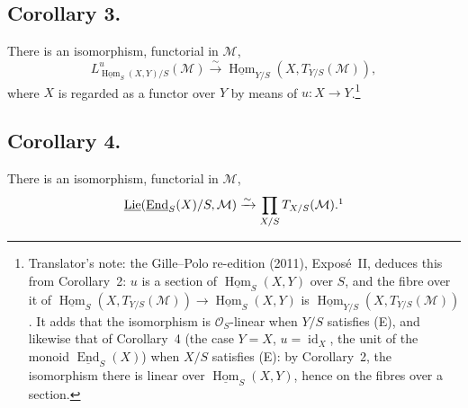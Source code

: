 \subsection*{Corollary 3.}
There is an isomorphism, functorial in \(\mathcal M\),
\[
  L^u_{\underline{\operatorname{Hom}}_S(X,Y)/S}(\mathcal M)
  \xrightarrow{\sim}
  \underline{\operatorname{Hom}}_{Y/S}(X,T_{Y/S}(\mathcal M)),
\]
where \(X\) is regarded as a functor over \(Y\) by means of
\(u:X\to Y\).\footnote{Translator's note: the Gille--Polo re-edition (2011),
Expos\'e~II, deduces this from Corollary~2: \(u\) is a section of
\(\underline{\operatorname{Hom}}_S(X,Y)\) over \(S\), and the fibre over it
of \(\underline{\operatorname{Hom}}_S(X,T_{Y/S}(\mathcal M))\to
\underline{\operatorname{Hom}}_S(X,Y)\) is
\(\underline{\operatorname{Hom}}_{Y/S}(X,T_{Y/S}(\mathcal M))\). It adds that
the isomorphism is \(\mathcal O_S\)-linear when \(Y/S\) satisfies (E), and
likewise that of Corollary~4 (the case \(Y=X\), \(u=\operatorname{id}_X\),
the unit of the monoid \(\underline{\operatorname{End}}_S(X)\)) when \(X/S\)
satisfies (E): by Corollary~2, the isomorphism there is linear over
\(\underline{\operatorname{Hom}}_S(X,Y)\), hence on the fibres over a
section.}

\subsection*{Corollary 4.}
There is an isomorphism, functorial in \(\mathcal M\),
\[
  \underline{\operatorname{Lie}}
    (\underline{\operatorname{End}}_S(X)/S,\mathcal M)
  \xrightarrow{\sim}
  \prod_{X/S}T_{X/S}(\mathcal M).\footnotemark
\]

